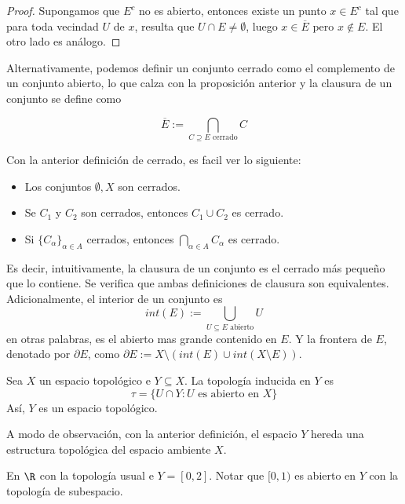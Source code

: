 \documentclass[11pt]{article}
\begin{document}
\begin{proof}
    Supongamos que $E^{c}$ no es abierto, entonces existe un punto $x\in E^{c}$ tal que para toda
    vecindad $U$ de $x$, resulta que $U\cap E\neq\emptyset$, luego $x\in\overline{E}$ pero 
    $x\not\in E$. El otro lado es análogo.
\end{proof}

\noindent Alternativamente, podemos definir un conjunto cerrado como el complemento de un conjunto
abierto, lo que calza con la proposición anterior y la clausura de un conjunto se define como

\begin{equation*}
    \overline{E}:=\bigcap_{C\supseteq E\text{ cerrado}}C
\end{equation*}

\noindent Con la anterior definición de cerrado, es facil ver lo siguiente:
\begin{itemize}
    \item Los conjuntos $\emptyset,X$ son cerrados.
    \item Se $C_{1}$ y $C_{2}$ son cerrados, entonces $C_{1}\cup C_{2}$ es cerrado.
    \item Si $\{C_{\alpha}\}_{\alpha\in A}$ cerrados, entonces $\bigcap_{\alpha\in A}C_{\alpha}$
    es cerrado.
\end{itemize}
Es decir, intuitivamente, la clausura de un conjunto es el cerrado más pequeño que lo contiene. Se
verifica que ambas definiciones de clausura son equivalentes. Adicionalmente, el interior de un
conjunto es
\begin{equation*}
    int(E):=\bigcup_{U\subseteq E\text{ abierto}}U
\end{equation*}
en otras palabras, es el abierto mas grande contenido en $E$. Y la frontera de $E$, denotado por 
$\partial E$, como $\partial E:=X\setminus{(int(E)\cup int(X\setminus E))}$.

\begin{dfn}
    Sea $X$ un espacio topológico e $Y\subseteq X$. La topología inducida en $Y$ es
    \begin{equation*}
        \tau=\{U\cap Y:U\text{ es abierto en }X\}
    \end{equation*}
    Así, $Y$ es un espacio topológico.
\end{dfn}

\noindent A modo de observación, con la anterior definición, el espacio $Y$ hereda una estructura 
topológica del espacio ambiente $X$.

\begin{ejm}
    En $\R$ con la topología usual e $Y=[0,2]$. Notar que $[0,1)$ es abierto en $Y$ con la 
    topología de subespacio.
\end{ejm}
\end{document}
